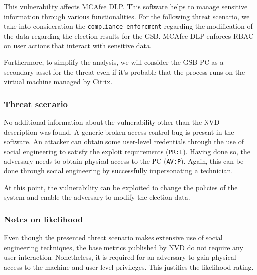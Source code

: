 This vulnerability affects MCAfee DLP. This software helps to manage sensitive information through various functionalities\cite{online:mcafee}. For the following threat scenario, we take into consideration the \texttt{compliance enforcment} regarding the modification of the data regarding the election results for the GSB. MCAfee DLP enforces RBAC on user actions that interact with sensitive data. 

Furthermore, to simplify the analysis, we will consider the GSB PC as a secondary asset for the threat even if it's probable that the process runs on the virtual machine managed by Citrix.

\subsubsection*{Threat scenario}

No additional information about the vulnerability other than the NVD description was found. A generic broken access control bug is present in the software. An attacker can obtain some user-level credentials through the use of social engineering to satisfy the exploit requirements (\texttt{PR:L}). Having done so, the adversary needs to obtain physical access to the PC (\texttt{AV:P}). Again, this can be done through social engineering by successfully impersonating a technician.

At this point, the vulnerability can be exploited to change the policies of the system and enable the adversary to modify the election data.

\subsubsection*{Notes on likelihood}

Even though the presented threat scenario makes extensive use of social engineering techniques, the base metrics published by NVD do not require any user interaction. Nonetheless, it is required for an adversary to gain physical access to the machine and user-level privileges. This justifies the likelihood rating.
